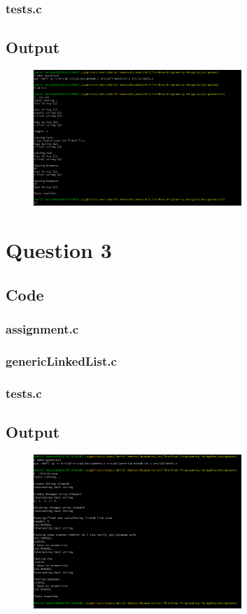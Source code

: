 \documentclass{article}
\begin{document}
			\subsubsection{tests.c}
		\newpage
		\subsection{Output}
			\begin{figure}[h!]
				\centering
				\includegraphics[width=0.7\textwidth]{2.png}
			\end{figure}
	\section{Question 3}
		\subsection{Code}
			\subsubsection{assignment.c}
			\subsubsection{genericLinkedList.c}
			\subsubsection{tests.c}
		\newpage
		\subsection{Output}
			\begin{figure}[h!]
				\centering
				\includegraphics[width=0.7\textwidth]{3.png}
			\end{figure}
\end{document}
